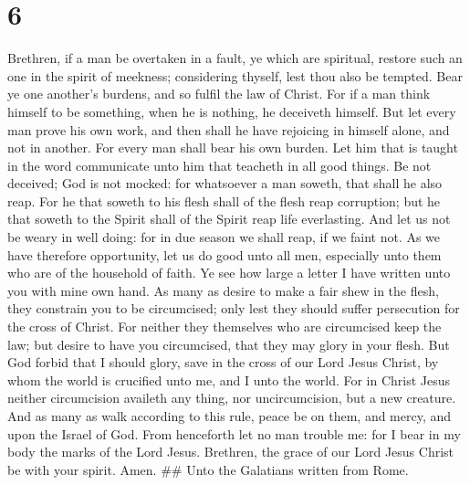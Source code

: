 \hypertarget{section-5}{%
\section{6}\label{section-5}}

 Brethren, if a man be overtaken in a fault, ye which are
spiritual, restore such an one in the spirit of meekness; considering
thyself, lest thou also be tempted.  Bear ye one another's
burdens, and so fulfil the law of Christ.  For if a man
think himself to be something, when he is nothing, he deceiveth himself.
 But let every man prove his own work, and then shall he
have rejoicing in himself alone, and not in another.  For
every man shall bear his own burden.  Let him that is taught
in the word communicate unto him that teacheth in all good things.
 Be not deceived; God is not mocked: for whatsoever a man
soweth, that shall he also reap.  For he that soweth to his
flesh shall of the flesh reap corruption; but he that soweth to the
Spirit shall of the Spirit reap life everlasting.  And let
us not be weary in well doing: for in due season we shall reap, if we
faint not.  As we have therefore opportunity, let us do
good unto all men, especially unto them who are of the household of
faith.  Ye see how large a letter I have written unto you
with mine own hand.  As many as desire to make a fair shew
in the flesh, they constrain you to be circumcised; only lest they
should suffer persecution for the cross of Christ.  For
neither they themselves who are circumcised keep the law; but desire to
have you circumcised, that they may glory in your flesh. 
But God forbid that I should glory, save in the cross of our Lord Jesus
Christ, by whom the world is crucified unto me, and I unto the world.
 For in Christ Jesus neither circumcision availeth any
thing, nor uncircumcision, but a new creature.  And as many
as walk according to this rule, peace be on them, and mercy, and upon
the Israel of God.  From henceforth let no man trouble me:
for I bear in my body the marks of the Lord Jesus. 
Brethren, the grace of our Lord Jesus Christ be with your spirit. Amen.
\#\# Unto the Galatians written from Rome.

